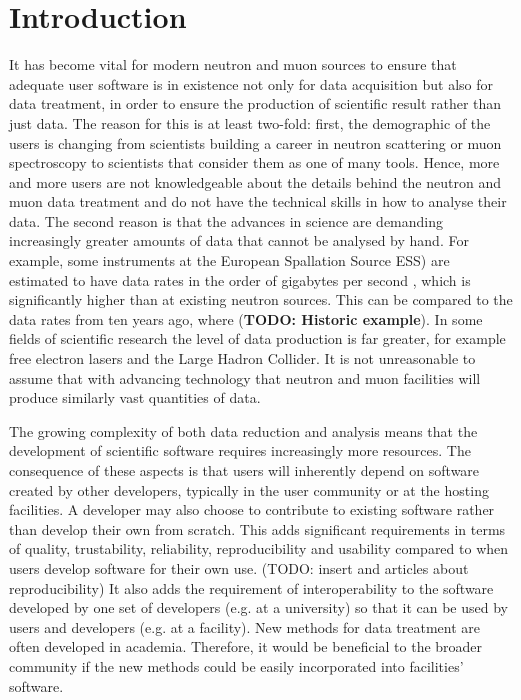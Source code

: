 \documentclass[jnr]{iosart2x}
\newcommand{\todo}[1]{\textbf{#1}}
\begin{document}
\begin{frontmatter}
\begin{keyword}
\end{keyword}

\end{frontmatter}

\newpage

\section{Introduction}
\label{Introduction}

It has become vital for modern neutron and muon sources to ensure that adequate user software is in existence not only for data acquisition but also for data treatment, in order to ensure the production of scientific result rather than just data.
The reason for this is at least two-fold: first, the demographic of the users is changing from scientists building a career in neutron scattering or muon spectroscopy to scientists that consider them as one of many tools.
Hence, more and more users are not knowledgeable about the details behind the neutron and muon data treatment and  do not have the technical skills in how to analyse their data.
The second reason is that the advances in science are demanding increasingly greater amounts of data that cannot be analysed by hand.
For example, some instruments at the
European Spallation Source ESS) are estimated to have data rates in the order of gigabytes per second \cite{Christensen_2018}, which is significantly higher than at existing neutron sources.
This can be compared to the data rates from ten years ago, where (\todo{TODO: Historic example}).
In some fields of scientific research the level of data production is far greater, for example free electron lasers and the Large Hadron Collider.
It is not unreasonable to assume that with advancing technology that neutron and muon facilities will produce similarly vast quantities of data.

The growing complexity of both data reduction and analysis means that the development of scientific software requires increasingly more resources.
The consequence of these aspects is that users will inherently depend on software created by other developers, typically in the user community or at the hosting facilities.
A developer may also choose to contribute to existing software rather than develop their own from scratch.
This adds significant requirements in terms of quality, trustability, reliability, reproducibility and usability compared to when users develop software for their own use.
(TODO: insert \cite{computational-science-error} and articles about reproducibility)
It also adds the requirement of interoperability to the software developed by one set of developers (e.g. at a university) so that it can be used by users and developers (e.g. at a facility).
New methods for data treatment are often developed in academia.
Therefore, it would be beneficial to the broader community if the new methods could be easily incorporated into facilities' software.
\end{document}
